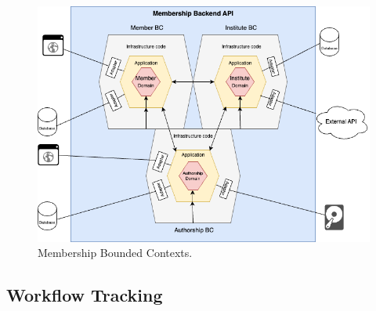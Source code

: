
\begin{figure}[H]
    \centering
    \includegraphics[width=1\linewidth]{figuras/modular_monolith (7).png}
    \caption{Membership Bounded Contexts.}
    \label{fig:membership_bc}
\end{figure}


\subsection{Workflow Tracking}


